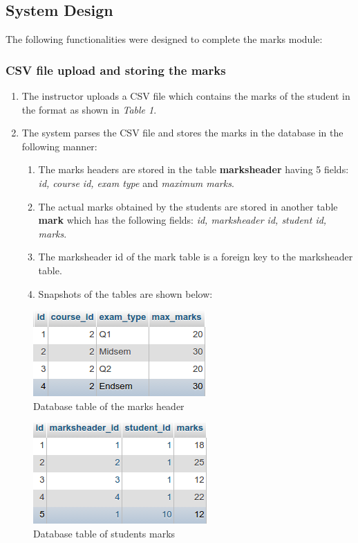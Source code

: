 \subsection{System Design}

The following functionalities were designed to complete the marks module:

\subsubsection{CSV file upload and storing the marks}

\begin{enumerate}
	\item The instructor uploads a CSV file which contains the marks of the student in the format as shown in \textit{Table 1}.
	\item The system parses the CSV file and stores the marks in the database in the following manner:
	\begin{enumerate}
		\item The marks headers are stored in the table \textbf{marksheader} having 5 fields: \textit{id, course id, exam type} and \textit{maximum marks}.
		\item The actual marks obtained by the students are stored in another table \textbf{mark} which has the following fields: \textit{id, marksheader id, student id, marks}.
		\item The marksheader id of the mark table is a foreign key to the marksheader table.
		\item Snapshots of the tables are shown below:
	\end{enumerate}
\end{enumerate}
\newpage		
	\begin{figure}[h]
	\centering
	\includegraphics[width=0.4\linewidth]{./media/MarksHeader}
	\caption{Database table of the marks header}
	\label{fig:MarksHeader}
	\end{figure}
	\begin{figure}[h]
	\centering
	\includegraphics[width=0.4\linewidth]{./media/mark}
	\caption{Database table of students marks}
	\label{fig:mark}
	\end{figure}

